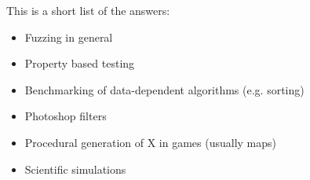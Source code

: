 \documentclass{wg21}
\begin{document}
This is a short list of the answers:

\begin{itemize}
    \item Fuzzing in general
    \item Property based testing
    \item Benchmarking of data-dependent algorithms (e.g. sorting)
    \item Photoshop filters
    \item Procedural generation of X in games (usually maps)
    \item Scientific simulations
\end{itemize}

%
%
\end{document}
